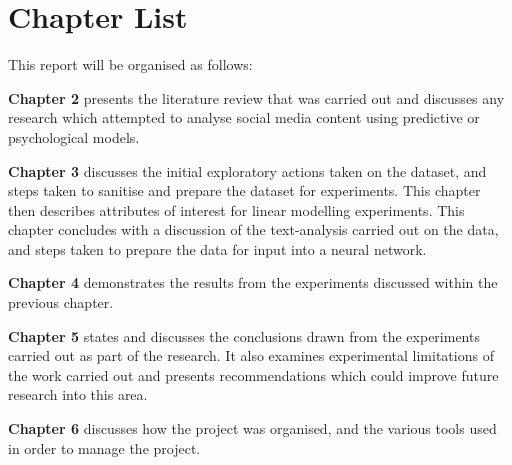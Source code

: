 \section{Chapter List}
This report will be organised as follows:

\textbf{Chapter 2} presents the literature review that was carried out and discusses any research which attempted to analyse social media content using predictive or psychological models.

\textbf{Chapter 3} discusses the initial exploratory actions taken on the dataset, and steps taken to sanitise and prepare the dataset for experiments. This chapter then describes attributes of interest for linear modelling experiments. This chapter concludes with a discussion of the text-analysis carried out on the data, and steps taken to prepare the data for input into a neural network.

\textbf{Chapter 4} demonstrates the results from the experiments discussed within the previous chapter.

\textbf{Chapter 5} states and discusses the conclusions drawn from the experiments carried out as part of the research. It also examines experimental limitations of the work carried out and presents recommendations which could improve future research into this area.

\textbf{Chapter 6} discusses how the project was organised, and the various tools used in order to manage the project.

